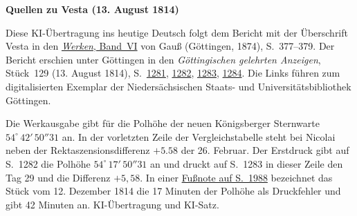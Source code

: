 \clearpage\thispagestyle{empty}
\begin{center}\textbf{Quellen zu Vesta (13. August 1814)}\end{center}
\noindent Diese KI-Übertragung ins heutige Deutsch folgt dem Bericht mit der Überschrift Vesta in den \href{https://gdz.sub.uni-goettingen.de/id/PPN236007467}{\textit{Werken}, Band~VI} von Gauß (Göttingen, 1874), S.~377--379. Der Bericht erschien unter Göttingen in den \textit{Göttingischen gelehrten Anzeigen}, Stück~129 (13. August 1814), S.~\href{https://images.p.sub.uni-goettingen.de/iiif/image/gdz:PPN319721507_1814:00001287/full/1600,/0/default.jpg}{1281}, \href{https://images.p.sub.uni-goettingen.de/iiif/image/gdz:PPN319721507_1814:00001288/full/1600,/0/default.jpg}{1282}, \href{https://images.p.sub.uni-goettingen.de/iiif/image/gdz:PPN319721507_1814:00001289/full/1600,/0/default.jpg}{1283}, \href{https://images.p.sub.uni-goettingen.de/iiif/image/gdz:PPN319721507_1814:00001290/full/1600,/0/default.jpg}{1284}. Die Links führen zum digitalisierten Exemplar der Niedersächsischen Staats- und Universitätsbibliothek Göttingen.
\par\smallskip\noindent Die Werkausgabe gibt für die Polhöhe der neuen Königsberger Sternwarte $54^\circ\,42'\,50''31$ an. In der vorletzten Zeile der Vergleichstabelle steht bei Nicolai neben der Rektaszensionsdifferenz $+5.58$ der 26. Februar. Der Erstdruck gibt auf S.~1282 die Polhöhe $54^\circ\,17'\,50''31$ an und druckt auf S.~1283 in dieser Zeile den Tag 29 und die Differenz $+5{,}58$. In einer \href{https://images.p.sub.uni-goettingen.de/iiif/image/gdz:PPN319721507_1814:00001996/full/1600,/0/default.jpg}{Fußnote auf S.~1988} bezeichnet das Stück vom 12. Dezember 1814 die 17 Minuten der Polhöhe als Druckfehler und gibt 42 Minuten an. KI-Übertragung und KI-Satz.
\clearpage
